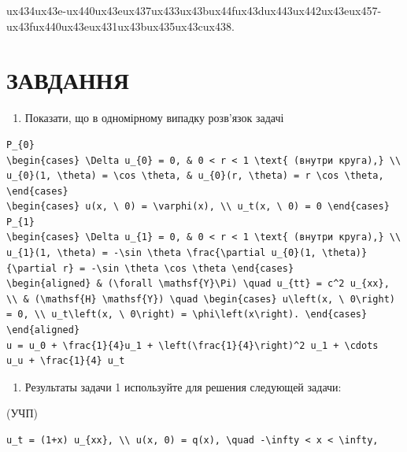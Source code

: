 \documentclass[
  ukrainian,
]{article}
\providecommand{\tightlist}{%
  \setlength{\itemsep}{0pt}\setlength{\parskip}{0pt}}
\begin{document}
{ux434ux43e-ux440ux43eux437ux433ux43bux44fux43dux443ux442ux43eux457-ux43fux440ux43eux431ux43bux435ux43cux438.}

\section{ЗАВДАННЯ}\label{ux437ux430ux432ux434ux430ux43dux43dux44f-1}

\begin{enumerate}
\def\labelenumi{\arabic{enumi}.}
\tightlist
\item
  Показати, що в одномірному випадку розв'язок задачі
\end{enumerate}

\begin{verbatim}
P_{0}
\begin{cases} \Delta u_{0} = 0, & 0 < r < 1 \text{ (внутри круга),} \\ u_{0}(1, \theta) = \cos \theta, & u_{0}(r, \theta) = r \cos \theta, \end{cases}
\begin{cases} u(x, \ 0) = \varphi(x), \\ u_t(x, \ 0) = 0 \end{cases}
P_{1}
\begin{cases} \Delta u_{1} = 0, & 0 < r < 1 \text{ (внутри круга),} \\ u_{1}(1, \theta) = -\sin \theta \frac{\partial u_{0}(1, \theta)}{\partial r} = -\sin \theta \cos \theta \end{cases}
\begin{aligned} & (\forall \mathsf{Y}\Pi) \quad u_{tt} = c^2 u_{xx}, \\ & (\mathsf{H} \mathsf{Y}) \quad \begin{cases} u\left(x, \ 0\right) = 0, \\ u_t\left(x, \ 0\right) = \phi\left(x\right). \end{cases} \end{aligned}
u = u_0 + \frac{1}{4}u_1 + \left(\frac{1}{4}\right)^2 u_1 + \cdots
u_u + \frac{1}{4} u_t
\end{verbatim}

\begin{enumerate}
\def\labelenumi{\arabic{enumi}.}
\setcounter{enumi}{1}
\tightlist
\item
  Результаты задачи 1 используйте для решения следующей задачи:
\end{enumerate}

(УЧП)

\begin{verbatim}
u_t = (1+x) u_{xx}, \\ u(x, 0) = q(x), \quad -\infty < x < \infty,
\end{verbatim}
\end{document}
